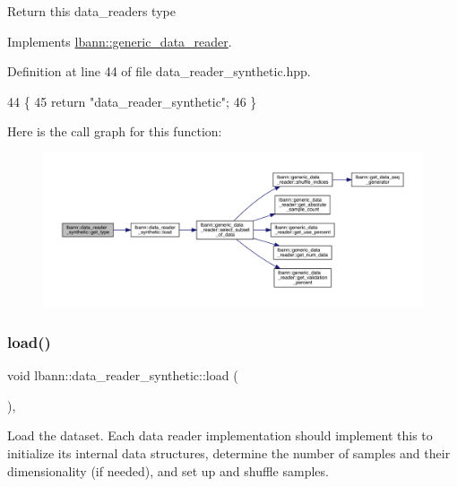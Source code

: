 Return this data\+\_\+reader\textquotesingle{}s type 

Implements \hyperlink{classlbann_1_1generic__data__reader_abeb849fb8e10b4fa317c90bc33f61758}{lbann\+::generic\+\_\+data\+\_\+reader}.



Definition at line 44 of file data\+\_\+reader\+\_\+synthetic.\+hpp.


\begin{DoxyCode}
44                                       \{
45     \textcolor{keywordflow}{return} \textcolor{stringliteral}{"data\_reader\_synthetic"};
46   \}
\end{DoxyCode}
Here is the call graph for this function\+:\nopagebreak
\begin{figure}[H]
\begin{center}
\leavevmode
\includegraphics[width=350pt]{classlbann_1_1data__reader__synthetic_a4093c7f0b76b3c8df2980c6b7b13e163_cgraph}
\end{center}
\end{figure}
\mbox{\label{classlbann_1_1data__reader__synthetic_a0c57b7ff8fcb0c700fd412a9ee29dc28}} 
\subsubsection{\texorpdfstring{load()}{load()}}
{\footnotesize\ttfamily void lbann\+::data\+\_\+reader\+\_\+synthetic\+::load (\begin{DoxyParamCaption}{ }\end{DoxyParamCaption})\hspace{0.3cm}{\ttfamily [override]}, {\ttfamily [virtual]}}

Load the dataset. Each data reader implementation should implement this to initialize its internal data structures, determine the number of samples and their dimensionality (if needed), and set up and shuffle samples. 

